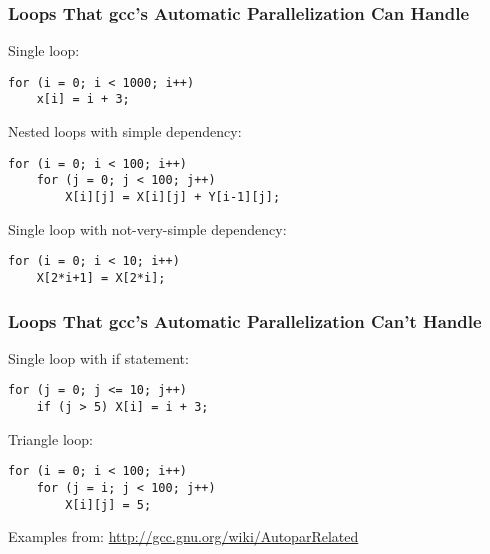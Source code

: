 \begin{frame}[fragile]
  \frametitle{Loops That gcc's Automatic Parallelization Can Handle}


  Single loop:
  \begin{lstlisting}
for (i = 0; i < 1000; i++)
    x[i] = i + 3;
  \end{lstlisting}
  \vfill
  Nested loops with simple dependency:
  \begin{lstlisting}
for (i = 0; i < 100; i++)
    for (j = 0; j < 100; j++)
        X[i][j] = X[i][j] + Y[i-1][j];
  \end{lstlisting}
  \vfill
  Single loop with not-very-simple dependency:
  \begin{lstlisting}
for (i = 0; i < 10; i++)
    X[2*i+1] = X[2*i];
  \end{lstlisting}

\end{frame}

\begin{frame}[fragile]
  \frametitle{Loops That gcc's Automatic Parallelization Can't Handle}


  Single loop with if statement:
  \begin{lstlisting}
for (j = 0; j <= 10; j++)
    if (j > 5) X[i] = i + 3;
  \end{lstlisting}
  \vfill
  Triangle loop:
  \begin{lstlisting}
for (i = 0; i < 100; i++)
    for (j = i; j < 100; j++)
        X[i][j] = 5;
  \end{lstlisting}
  \vfill
  Examples from: \url{http://gcc.gnu.org/wiki/AutoparRelated}

\end{frame}

